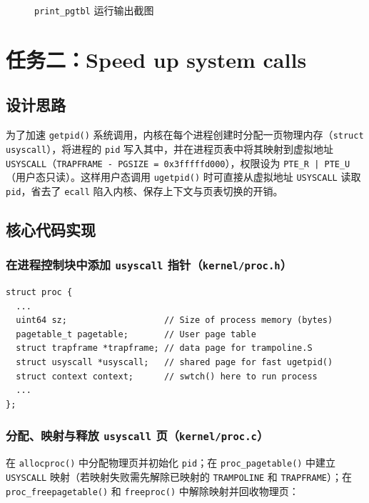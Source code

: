 \documentclass[12pt, a4paper]{ctexart}
\begin{document}
\begin{figure}[H]
    \centering
    \caption{\texttt{print\_pgtbl} 运行输出截图}
    \label{fig:print_pgtbl}
\end{figure}

\section{任务二：Speed up system calls}

\subsection{设计思路}
为了加速 \texttt{getpid()} 系统调用，内核在每个进程创建时分配一页物理内存（\texttt{struct usyscall}），将进程的 \texttt{pid} 写入其中，并在进程页表中将其映射到虚拟地址 \texttt{USYSCALL}（\texttt{TRAPFRAME - PGSIZE = 0x3fffffd000}），权限设为 \texttt{PTE\_R | PTE\_U}（用户态只读）。这样用户态调用 \texttt{ugetpid()} 时可直接从虚拟地址 \texttt{USYSCALL} 读取 \texttt{pid}，省去了 \texttt{ecall} 陷入内核、保存上下文与页表切换的开销。

\subsection{核心代码实现}

\subsubsection{在进程控制块中添加 \texttt{usyscall} 指针（\texttt{kernel/proc.h}）}
\begin{lstlisting}[caption={\texttt{kernel/proc.h} 中 \texttt{struct proc} 新增字段}]
struct proc {
  ...
  uint64 sz;                   // Size of process memory (bytes)
  pagetable_t pagetable;       // User page table
  struct trapframe *trapframe; // data page for trampoline.S
  struct usyscall *usyscall;   // shared page for fast ugetpid()
  struct context context;      // swtch() here to run process
  ...
};
\end{lstlisting}

\subsubsection{分配、映射与释放 \texttt{usyscall} 页（\texttt{kernel/proc.c}）}
在 \texttt{allocproc()} 中分配物理页并初始化 \texttt{pid}；在 \texttt{proc\_pagetable()} 中建立 \texttt{USYSCALL} 映射（若映射失败需先解除已映射的 \texttt{TRAMPOLINE} 和 \texttt{TRAPFRAME}）；在 \texttt{proc\_freepagetable()} 和 \texttt{freeproc()} 中解除映射并回收物理页：
\end{document}
